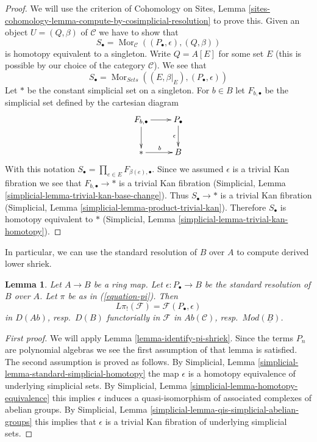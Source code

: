 \documentclass{stacks-project}
\theoremstyle{plain}
\newtheorem{lemma}[subsection]{Lemma}
\theoremstyle{definition}
\theoremstyle{remark}
\numberwithin{equation}{subsection}
\def\Mor{\mathop{\mathrm{Mor}}\nolimits}
\begin{document}
\begin{proof}
We will use the criterion of Cohomology on Sites, Lemma
\ref{sites-cohomology-lemma-compute-by-cosimplicial-resolution} to prove this.
Given an object $U = (Q, \beta)$ of $\mathcal{C}$ we have to show that
$$
S_\bullet = \Mor_\mathcal{C}((P_\bullet, \epsilon), (Q, \beta))
$$
is homotopy equivalent to a singleton.
Write $Q = A[E]$ for some set $E$ (this is possible by our choice of
the category $\mathcal{C}$). We see that
$$
S_\bullet = \Mor_{\textit{Sets}}((E, \beta|_E), (P_\bullet, \epsilon))
$$
Let $*$ be the constant simplicial set on a singleton. For $b \in B$
let $F_{b, \bullet}$ be the simplicial set defined by the cartesian
diagram
$$
\xymatrix{
F_{b, \bullet} \ar[r] \ar[d] & P_\bullet \ar[d]_\epsilon \\
{*} \ar[r]^b & B
}
$$
With this notation $S_\bullet = \prod_{e \in E} F_{\beta(e), \bullet}$.
Since we assumed $\epsilon$ is a trivial Kan fibration we see that
$F_{b, \bullet} \to *$ is a trivial Kan fibration
(Simplicial, Lemma \ref{simplicial-lemma-trivial-kan-base-change}).
Thus $S_\bullet \to *$ is a trivial Kan fibration
(Simplicial, Lemma \ref{simplicial-lemma-product-trivial-kan}).
Therefore $S_\bullet$ is homotopy equivalent to $*$
(Simplicial, Lemma \ref{simplicial-lemma-trivial-kan-homotopy}).
\end{proof}

\noindent
In particular, we can use the standard resolution of $B$ over $A$
to compute derived lower shriek.

\begin{lemma}
\label{lemma-pi-shriek-standard}
Let $A \to B$ be a ring map. Let $\epsilon : P_\bullet \to B$
be the standard resolution of $B$ over $A$. Let $\pi$ be as in
(\ref{equation-pi}). Then
$$
L\pi_!(\mathcal{F}) = \mathcal{F}(P_\bullet, \epsilon)
$$
in $D(\textit{Ab})$, resp.\ $D(B)$ functorially in $\mathcal{F}$ in
$\textit{Ab}(\mathcal{C})$, resp.\ $\textit{Mod}(\underline{B})$.
\end{lemma}

\begin{proof}[First proof]
We will apply Lemma \ref{lemma-identify-pi-shriek}.
Since the terms $P_n$ are polynomial algebras we see the first
assumption of that lemma is satisfied. The second assumption is proved
as follows. By
Simplicial, Lemma \ref{simplicial-lemma-standard-simplicial-homotopy}
the map $\epsilon$ is a homotopy equivalence of underlying
simplicial sets. By
Simplicial, Lemma \ref{simplicial-lemma-homotopy-equivalence}
this implies $\epsilon$ induces a quasi-isomorphism of associated
complexes of abelian groups. By
Simplicial, Lemma \ref{simplicial-lemma-qis-simplicial-abelian-groups}
this implies that $\epsilon$ is a trivial Kan fibration of underlying
simplicial sets.
\end{proof}
\end{document}
